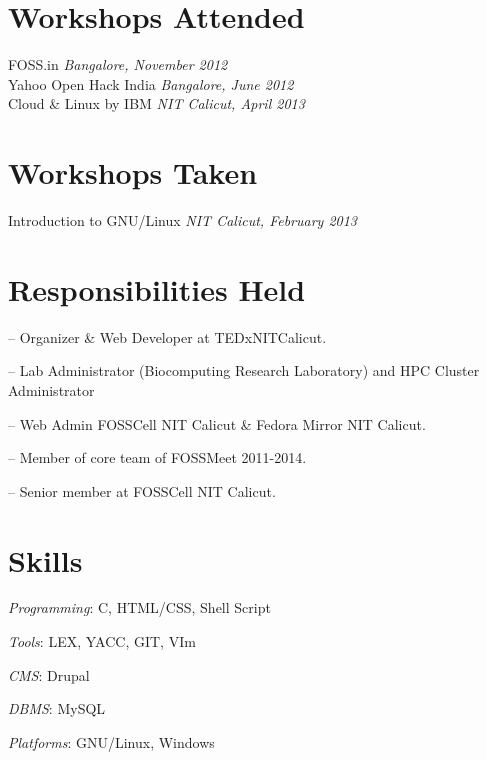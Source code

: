 \documentclass[margin,line]{resume}
\begin{document}
\begin{resume}
    \section{\mysidestyle Workshops Attended} 
	FOSS.in \hfill \textit{Bangalore, November 2012}  \\%
    Yahoo Open Hack India \hfill \textit{Bangalore, June 2012}    \\
    Cloud \& Linux by IBM \hfill \textit{NIT Calicut, April 2013}    \\

            


    \section{\mysidestyle Workshops Taken} 
	Introduction to GNU/Linux \hfill \textit{NIT Calicut, February 2013}    \\
    			    			

    \section{\mysidestyle Responsibilities Held } 
	\begin{list2}
	\item[--] Organizer \& Web Developer at TEDxNITCalicut.
	\item[--] Lab Administrator (Biocomputing Research Laboratory) and HPC Cluster Administrator
	\item[--] Web Admin FOSSCell NIT Calicut \& Fedora Mirror NIT Calicut.
	\item[--] Member of core team of FOSSMeet 2011-2014.
	\item[--] Senior member at FOSSCell NIT Calicut.
	
	\end{list2}

    \section{\mysidestyle Skills} 
    	\begin{list2}
	\item \textit{Programming}: C, HTML/CSS, Shell Script
	\item \textit{Tools}: LEX, YACC, GIT, VIm
	\item \textit{CMS}: Drupal
	\item \textit{DBMS}: MySQL
	\item \textit{Platforms}: GNU/Linux, Windows
	\end{list2}




\end{resume}
\end{document}
